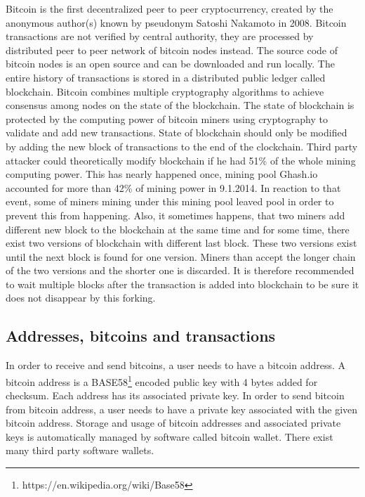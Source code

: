\documentclass[
  digital, %
  table,   %
  lof,     %
  lot,     %
  oneside
]{fithesis3}
\begin{document}
Bitcoin \parencite{nakamoto2008bitcoin} is the first decentralized peer to peer cryptocurrency,
created by the anonymous author(s) known by pseudonym Satoshi Nakamoto in 2008.
Bitcoin transactions are not verified by central authority, they are processed by distributed peer to peer network of bitcoin nodes instead. 
The source code of bitcoin nodes is an open source and can be downloaded and run locally. 
The entire history of transactions is stored in a distributed public ledger called blockchain.
Bitcoin combines multiple cryptography algorithms to achieve consensus among nodes
on the state of the blockchain.
The state of blockchain is protected by the computing power of bitcoin miners
using cryptography to validate and add new transactions.
State of blockchain should only be modified by adding the new block of transactions to the end of the clockchain.
Third party attacker could theoretically modify blockchain if he had 51\% of the whole mining computing power.
This has nearly happened once, mining pool 
 Ghash.io accounted for more than 42\% of mining power in 9.1.2014. In reaction to that event, some of miners
 mining under this mining pool leaved pool in order to prevent this from happening.
Also, it sometimes happens, that two miners add different new block to the blockchain at the same time
and for some time, there exist two versions of blockchain with different last block.
These two versions exist until the next block is found for one version.
Miners than accept the longer chain of the two versions and the shorter one is discarded.
It is therefore recommended to wait multiple blocks after the transaction is added into blockchain
to be sure it does not disappear by this forking.
 
\subsection{Addresses, bitcoins and transactions}
\label{btcadd}
In order to receive and send bitcoins, a user needs to have a bitcoin address.
A bitcoin address is a BASE58\footnote{https://en.wikipedia.org/wiki/Base58}
encoded public key with 4 bytes added for checksum.
Each address has its associated private key.
In order to send bitcoin from bitcoin address,
a user needs to have a private key associated with the given bitcoin address.
Storage and usage of bitcoin addresses and associated private keys is automatically managed
by software called bitcoin wallet. There exist many third party software wallets.
\end{document}
